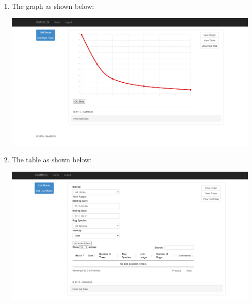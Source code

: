 \documentclass[11pt,a4paper,titlepage]{article}
\begin{document}
\begin{enumerate}
\begin{enumerate}
\begin{center}
			\end{center}
\item The graph as shown below:
			\begin{center}
				\includegraphics[scale=0.3]{graph.png}
			\end{center}
\item The table as shown below:
			\begin{center}
				\includegraphics[scale=0.3]{table.png}
			\end{center}
		\end{enumerate}
	\end{enumerate}
\end{document}
